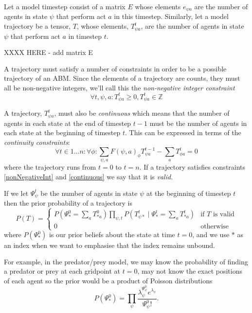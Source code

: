 \documentclass{article}
\begin{document}
Let a model timestep consist of a matrix $E$ whose elements $e_{\psi a}$ are the number of agents in state $\psi$ that perform act $a$ in this timestep. Similarly, let a model trajectory be a tensor, $T$, whose elements, $T^t_{\psi a}$, are the number of agents in state $\psi$ that perform act $a$ in timestep $t$.

XXXX HERE  - add matrix E

A trajectory must satisfy a number of constraints in order to be a possible trajectory of an ABM. Since the elements of a trajectory are counts, they must all be non-negative integers, we'll call this the \textit{non-negative integer constraint}
\begin{equation}
\forall t,\psi, a: T^t_{\psi a} \ge 0, T^t_{\psi a} \in \mathbb{Z}
\label{nonNegativeInt}
\end{equation}

A trajectory, $T^t_{\psi a}$, must also be \textit{continuous} which means that the number of agents in each state at the end of timestep $t-1$ must be the number of agents in each state at the beginning of timestep $t$. This can be expressed in terms of the \textit{continuity constraints}:
\begin{equation}
\forall t \in 1 ... n:\forall \phi: \sum_{\psi, a} F(\psi, a)_\phi T^{t-1}_{\psi a} - \sum_a T^t_{\phi a} = 0
\label{continuous}
\end{equation}
where the trajectory runs from $t=0$ to $t=n$. If a trajectory satisfies constraints \ref{nonNegativeInt} and \ref{continuous} we say that it is \textit{valid}.

If we let $\Psi^t_\psi$ be the number of agents in state $\psi$ at the beginning of timestep $t$ then the prior probability of a trajectory is
\[
P(T) =
\begin{cases}
P\left(\Psi^0_{*} = \sum_a T^0_{* a}\right) \prod_{\psi, t} P\left(T^t_{\psi *} \mid \Psi^t_* = \sum_a T^t_{* a}\right) & \text{if } T \text{ is valid} \\
0 & \text{otherwise}
\end{cases}
\]
where $P(\Psi^0_*)$ is our prior beliefs about the state at time $t=0$, and we use $*$ as an index when we want to emphasise that the index remains unbound.

For example, in the predator/prey model, we may know the probability of finding a predator or prey at each gridpoint at $t=0$, may not know the exact positions of each agent so the prior would be a product of Poisson distributions
\[
P(\Psi^0_*) = \prod_\psi \frac{\lambda_\psi^{\Psi^0_\psi} e^{\lambda_\psi}}{\Psi^0_\psi!}.
\]
\end{document}
